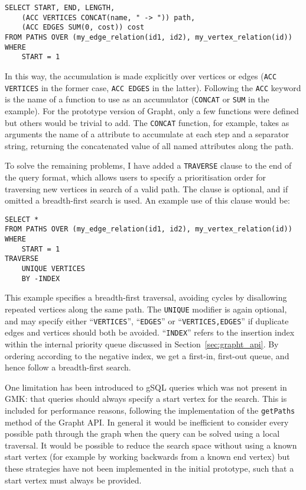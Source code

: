 \begin{verbatim}
SELECT START, END, LENGTH, 
    (ACC VERTICES CONCAT(name, " -> ")) path,
    (ACC EDGES SUM(0, cost)) cost 
FROM PATHS OVER (my_edge_relation(id1, id2), my_vertex_relation(id))
WHERE 
    START = 1
\end{verbatim}

In this way, the accumulation is made explicitly over vertices or edges
(\texttt{ACC VERTICES} in the former case, \texttt{ACC EDGES} in the latter).
Following the \texttt{ACC} keyword is the name of a function to use as
an accumulator (\texttt{CONCAT} or \texttt{SUM} in the example). For the
prototype version of Grapht, only a few functions were defined but others
would be trivial to add. The \texttt{CONCAT} function, for example, takes as
arguments the name of a attribute to accumulate at each step and a separator
string, returning the concatenated value of all named attributes along the
path.

To solve the remaining problems, I have added a \texttt{TRAVERSE} clause to
the end of the query format, which allows users to specify a prioritisation
order for traversing new vertices in search of a valid path. The clause is
optional, and if omitted a breadth-first search is used. An example use of this
clause would be:

\begin{verbatim}
SELECT * 
FROM PATHS OVER (my_edge_relation(id1, id2), my_vertex_relation(id))
WHERE 
    START = 1
TRAVERSE 
    UNIQUE VERTICES 
    BY -INDEX
\end{verbatim}

This example specifies a breadth-first traversal, avoiding cycles by
disallowing repeated vertices along the same path. The \texttt{UNIQUE}
modifier is again optional, and may specify either ``\texttt{VERTICES}'',
``\texttt{EDGES}'' or ``\texttt{VERTICES,EDGES}'' if duplicate edges and
vertices should both be avoided. ``\texttt{INDEX}'' refers to the insertion index within the internal priority queue discussed in Section~\ref{sec:grapht_api}. By ordering according to the negative index, we get a first-in, first-out queue, and hence follow a breadth-first search.

One limitation has been introduced to gSQL queries which was not present in
GMK: that queries should always specify a start vertex for the search.
This is included for performance reasons, following the implementation of the
\texttt{getPaths} method of the Grapht API.  In general it would be
inefficient to consider every possible path through the graph when the query
can be solved using a local traversal. It would be possible to reduce the
search space without using a known start vertex (for example by working
backwards from a known end vertex) but these strategies have not been
implemented in the initial prototype, such that a start vertex must always be
provided.




